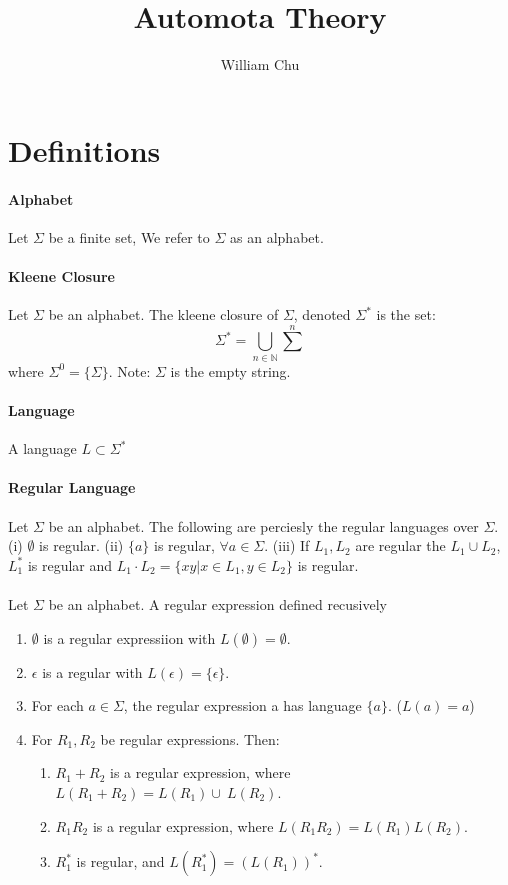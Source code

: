 \documentclass{article}
\begin{document}
 
\title{Automota Theory} 
\author{William Chu} 
\maketitle 

\section{Definitions}
\paragraph{Alphabet} Let $\Sigma$ be a finite set, We refer to $\Sigma$ as an alphabet.

\paragraph{Kleene Closure} Let $\Sigma$ be an alphabet. The kleene closure of $\Sigma$, denoted $\Sigma^*$ is the set: $$\Sigma^* = \bigcup_{n\in \mathbb{N}}\sum^n$$ where $\Sigma^0=\{\Sigma\}$. Note: $\Sigma$ is the empty string.

\paragraph{Language} A language $L \subset \Sigma^*$

\paragraph{Regular Language}Let $\Sigma$ be an alphabet. The following are perciesly the regular languages over $\Sigma$. (i) $\emptyset$ is regular. (ii) $\{a\}$ is regular, $\forall a\in \Sigma$. (iii) If $L_1, L_2$ are regular the $L_1 \cup L_2$, $L_1^*$ is regular and $L_1 \cdot L_2 = \{xy|x \in L_1, y\in L_2\}$ is regular.

\paragraph{}Let $\Sigma$ be an alphabet. A regular expression defined recusively 
\begin{enumerate}
  \item $\emptyset$ is a regular expressiion with $L(\emptyset) = \emptyset$.
  \item $\epsilon$ is a regular with $L(\epsilon) = \{\epsilon\}$.
  \item For each $a\in \Sigma$, the regular expression a has language $\{a\}$. ($L(a) = {a}$)
  \item For $R_1, R_2$ be regular expressions. Then:
    \begin{enumerate}
      \item $R_1+R_2$ is a regular expression, where $L(R_1+R_2)=L(R_1)\cup\ L(R_2)$. 
      \item $R_1R_2$ is a regular expression, where $L(R_1R_2) = L(R_1)L(R_2)$.
      \item $R_1^*$ is regular, and $L(R_1^*) = (L(R_1))^*$.
    \end{enumerate}
\end{enumerate}
\end{document}
